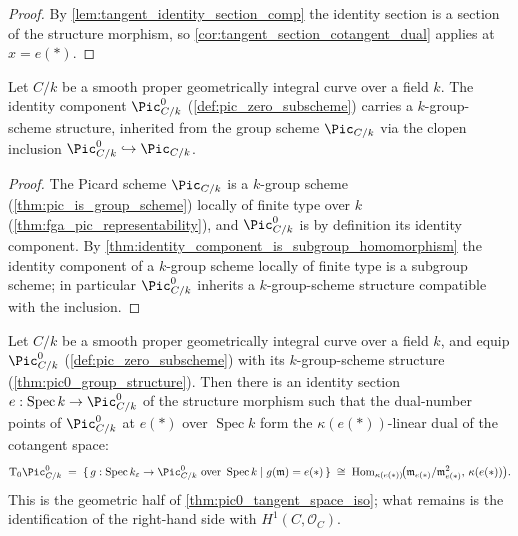 \begin{proof}\leanok
  By \cref{lem:tangent_identity_section_comp} the identity section is
  a section of the structure morphism, so
  \cref{cor:tangent_section_cotangent_dual} applies at \(x = e(*)\).
\end{proof}

\begin{theorem}\leanok
  \label{thm:pic0_group_structure}
  Let \(C/k\) be a smooth proper geometrically integral curve over a
  field \(k\). The identity component \(\Pic^0_{C/k}\)
  (\cref{def:pic_zero_subscheme}) carries a \(k\)-group-scheme
  structure, inherited from the group scheme \(\Pic_{C/k}\) via the
  clopen inclusion \(\Pic^0_{C/k} \hookrightarrow \Pic_{C/k}\).
\end{theorem}

\begin{proof}\leanok
  The Picard scheme \(\Pic_{C/k}\) is a \(k\)-group scheme
  (\cref{thm:pic_is_group_scheme}) locally of finite type over \(k\)
  (\cref{thm:fga_pic_representability}), and \(\Pic^0_{C/k}\) is by
  definition its identity component. By
  \cref{thm:identity_component_is_subgroup_homomorphism} the identity
  component of a \(k\)-group scheme locally of finite type is a
  subgroup scheme; in particular \(\Pic^0_{C/k}\) inherits a
  \(k\)-group-scheme structure compatible with the inclusion.
\end{proof}

\begin{theorem}\leanok
  \label{thm:pic0_tangent_cotangent_dual}
  Let \(C/k\) be a smooth proper geometrically integral curve over a
  field \(k\), and equip \(\Pic^0_{C/k}\)
  (\cref{def:pic_zero_subscheme}) with its \(k\)-group-scheme
  structure (\cref{thm:pic0_group_structure}). Then there
  is an identity section \(e : \operatorname{Spec} k \to
  \Pic^0_{C/k}\) of the structure morphism such that the dual-number
  points of \(\Pic^0_{C/k}\) at \(e(*)\) over \(\operatorname{Spec} k\)
  form the \(\kappa(e(*))\)-linear dual of the cotangent space:
  \[
    \tu T_0 \Pic^0_{C/k}
    \;=\;
    \{\, g : \operatorname{Spec} k_\varepsilon \to \Pic^0_{C/k}
        \text{ over } \operatorname{Spec} k
        \mid g(\mathfrak m) = e(*) \,\}
    \;\cong\;
    \operatorname{Hom}_{\kappa(e(*))}\!\bigl(
      \mathfrak m_{e(*)}/\mathfrak m_{e(*)}^2,\, \kappa(e(*))\bigr).
  \]
  This is the geometric half of \cref{thm:pic0_tangent_space_iso};
  what remains is the identification of the right-hand side with
  \(H^1(C, \mathcal O_C)\).
\end{theorem}

